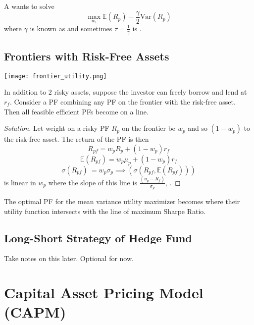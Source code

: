 \documentclass[12pt]{scrartcl}
\newcommand{\E}{\mathbb{E}}
\newcommand{\V}{\text{Var}}
\begin{document}
\begin{definition}
  A  wants to solve 
  \[\max_{w_1} \E(R_p) - \frac{\gamma}{2}\V(R_p)\]
  where $\gamma$ is known as  and sometimes 
  $\tau = \frac{1}{\gamma}$ is .
\end{definition}

\subsection{Frontiers with Risk-Free Assets}

\texttt{[image: frontier\_utility.png]}

\begin{remark}
  In addition to $2$ risky assets, suppose the investor can freely borrow and lend 
  at $r_f$. Consider a PF combining any PF on the frontier with the risk-free asset. 
  Then all feasible efficient PFs become on a line. 
\end{remark}

\begin{proof}[Solution]
  Let weight on a risky PF $R_p$ on the frontier be $w_p$ and so 
  $(1-w_p)$ to the risk-free asset. The return of the PF is then 
  \[R_{pf} = w_p R_p + (1-w_p)r_f\]
  \[\E(R_{pf}) = w_p\mu_p + (1-w_p)r_f\]
  \[\sigma(R_{pf})\ = w_p\sigma_p \implies (\sigma(R_{pf}, \E(R_{pf})))\]
  is linear in $w_p$ where the slope of this line is $\frac{(u_p - R_f)}{\sigma_p}$, .
\end{proof}

\begin{note}
  The optimal PF for the mean variance utility maximizer becomes where their utility function 
  intersects with the line of maximum Sharpe Ratio.
\end{note}

\subsection{Long-Short Strategy of Hedge Fund}

Take notes on this later. Optional for now. 

\section{Capital Asset Pricing Model (CAPM)}
\end{document}
